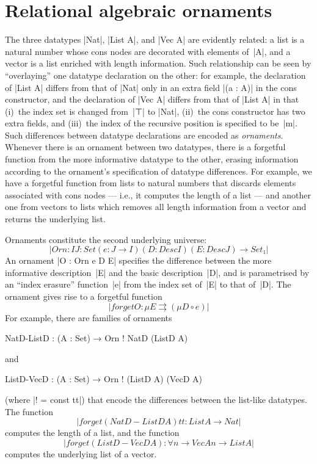 \chapter{Relational algebraic ornaments}
\label{chapter:algebraic}

The three datatypes |Nat|, |List A|, and |Vec A| are evidently related: a list is a natural number whose cons nodes are decorated with elements of~|A|, and a vector is a list enriched with length information.
Such relationship can be seen by ``overlaying'' one datatype declaration on the other: for example, the declaration of |List A| differs from that of |Nat| only in an extra field |(a : A)| in the cons constructor, and the declaration of |Vec A| differs from that of |List A| in that (i)~the index set is changed from~|⊤| to |Nat|, (ii)~the cons constructor has two extra fields, and (iii)~the index of the recursive position is specified to be~|m|.
Such differences between datatype declarations are encoded as \emph{ornaments}.
Whenever there is an ornament between two datatypes, there is a forgetful function from the more informative datatype to the other, erasing information according to the ornament's specification of datatype differences.
For example, we have a forgetful function from lists to natural numbers that discards elements associated with cons nodes --- i.e., it computes the length of a list --- and another one from vectors to lists which removes all length information from a vector and returns the underlying list.

Ornaments constitute the second underlying universe:
\[ |Orn : {I J : Set} (e : J → I) (D : Desc I) (E : Desc J) → Set₁| \]
An ornament |O : Orn e D E| specifies the difference between the more informative description~|E| and the basic description~|D|, and is parametrised by an ``index erasure'' function~|e| from the index set of~|E| to that of~|D|.
The ornament gives rise to a forgetful function
\[ |forget O : μ E ⇉ (μ D ∘ e)| \]
For example, there are families of ornaments
\savecolumns
\begin{code}
NatD-ListD  :  (A : Set) → Orn ! NatD (ListD A)
\end{code}
and
\restorecolumns
\begin{code}
ListD-VecD  :  (A : Set) → Orn ! (ListD A) (VecD A)
\end{code}
(where |! = const tt|) that encode the differences between the list-like datatypes.
The function
\[ |forget (NatD-ListD A) {tt} : List A → Nat| \]
computes the length of a list, and the function
\[ |forget (ListD-VecD A) : ∀ {n} → Vec A n → List A| \]
computes the underlying list of a vector.

